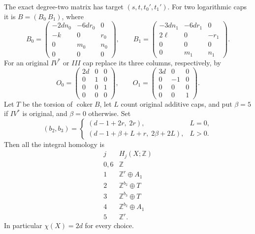 \begin{theorem}
The exact degree-two matrix has target $(s,t,t_0',t_1')$.
For two logarithmic caps it is $B=(B_0\ B_1)$, where
\[
 B_0=
 \begin{pmatrix}
 -2dn_0&-6dr_0&0\\
 -k&0&r_0\\
 0&m_0&n_0\\
 0&0&0
 \end{pmatrix},
 \qquad
 B_1=
 \begin{pmatrix}
 -3dn_1&-6dr_1&0\\
 2\ell&0&-r_1\\
 0&0&0\\
 0&m_1&n_1
 \end{pmatrix}.                                           \tag{D.WE3}\label{maps:eq:D.WE3}
\]
For an original $IV^*$ or $III$ cap replace its three
columns, respectively, by
\[
 O_0=
 \begin{pmatrix}2d&0&0\\0&1&0\\0&0&1\\0&0&0\end{pmatrix},
 \qquad
 O_1=
 \begin{pmatrix}3d&0&0\\0&-1&0\\0&0&0\\0&0&1\end{pmatrix}.
                                                               \tag{D.WE4}\label{maps:eq:D.WE4}
\]
Let $T$ be the torsion of $\operatorname{coker}B$,
let $L$ count original additive caps, and put
$\beta=5$ if $IV^*$ is original, and $\beta=0$ otherwise.
Set
\[
 (b_2,b_3)=
 \begin{cases}
 (d-1+2r,\;2r),&L=0,\\
 (d-1+\beta+L+r,\;2\beta+2L),&L>0.
 \end{cases}                                               \tag{D.WE5}\label{maps:eq:D.WE5}
\]
Then all the integral homology is
\[
\begin{array}{c|c}
j&H_j(X;\mathbb Z)\\\hline
0,6&\mathbb Z\\
1&\mathbb Z^r\oplus A_1\\
2&\mathbb Z^{b_2}\oplus T\\
3&\mathbb Z^{b_3}\oplus T\\
4&\mathbb Z^{b_2}\oplus A_1\\
5&\mathbb Z^r .
\end{array}                                                \tag{D.WE6}\label{maps:eq:D.WE6}
\]
In particular $\chi(X)=2d$ for every choice.


\end{theorem}
